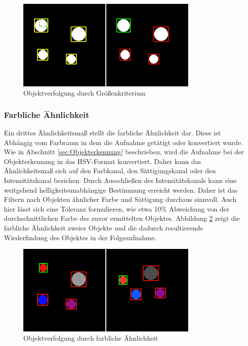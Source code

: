 \begin{figure}[h]
\centering
\includegraphics[width=0.8\textwidth]{Bilder/Workloop/BigObject}
\caption{Objektverfolgung durch Größenkriterium}
\label{fig:GroessenKriterium}
\end{figure}


\subsubsection{Farbliche Ähnlichkeit}
Ein drittes Ähnlichkeitsmaß stellt die farbliche Ähnlichkeit dar. Diese ist Abhängig vom Farbraum in dem die Aufnahme getätigt oder konvertiert wurde. Wie in Abschnitt \ref{sec:Objekterkennung} beschrieben, wird die Aufnahme bei der Objekterkennung in das HSV-Format konvertiert. Daher kann das Ähnlichkeitsmaß sich auf den Farbkanal, den Sättigungskanal oder den Intensitätskanal beziehen. Durch Ausschließen des Intensitätskanals kann eine weitgehend helligkeitsunabhängige Bestimmung erreicht werden. Daher ist das Filtern nach Objekten ähnlicher Farbe und Sättigung durchaus sinnvoll. Auch hier lässt sich eine Toleranz formulieren, wie etwa 10\% Abweichung von der durchschnittlichen Farbe des zuvor ermittelten Objektes. Abbildung \ref{fig:FarbKriterium} zeigt die farbliche Ähnlichkeit zweier Objekte und die dadurch resultierende Wiederfindung des Objektes in der Folgeaufnahme.

\begin{figure}[h]
\centering
\includegraphics[width=0.8\textwidth]{Bilder/Workloop/ColoredObjects}
\caption{Objektverfolgung durch farbliche Ähnlichkeit}
\label{fig:FarbKriterium}
\end{figure}

